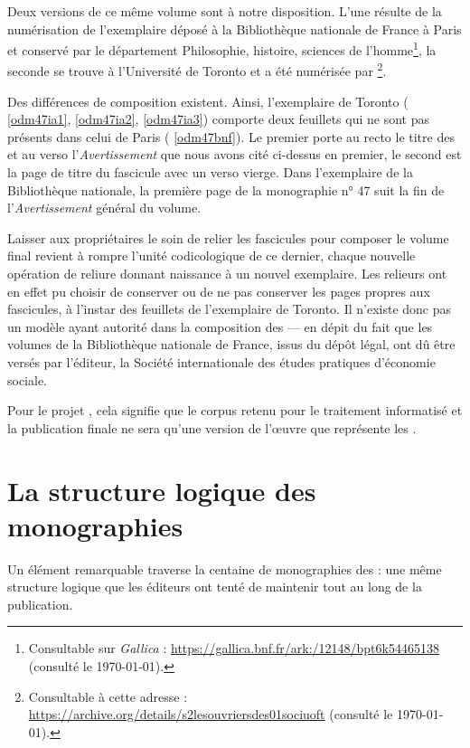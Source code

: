 Deux versions de ce même volume sont à notre disposition. L'une résulte de la numérisation de l'exemplaire déposé à la Bibliothèque nationale de France à Paris et conservé par le département Philosophie, histoire, sciences de l'homme\footnote{Consultable sur \textit{Gallica} : \url{https://gallica.bnf.fr/ark:/12148/bpt6k54465138} (consulté le \today).}, la seconde se trouve à l'Université de Toronto et a été numérisée par \ia\footnote{Consultable à cette adresse : \url{https://archive.org/details/s2lesouvriersdes01sociuoft} (consulté le \today).}.

Des différences de composition existent. Ainsi, l'exemplaire de Toronto (\fig{} \ref{odm47ia1}, \ref{odm47ia2}, \ref{odm47ia3}) comporte deux feuillets qui ne sont pas présents dans celui de Paris (\fig{} \ref{odm47bnf}). Le premier porte au recto le titre des \odm{} et au verso l'\textit{Avertissement} que nous avons cité ci-dessus en premier, le second est la page de titre du fascicule avec un verso vierge. Dans l'exemplaire de la Bibliothèque nationale, la première page de la monographie n° 47 suit la fin de l'\textit{Avertissement} général du volume.

Laisser aux propriétaires le soin de relier les fascicules pour composer le volume final revient à rompre l'unité codicologique de ce dernier, chaque nouvelle opération de reliure donnant naissance à un nouvel exemplaire. Les relieurs ont en effet pu choisir de conserver ou de ne pas conserver les pages propres aux fascicules, à l'instar des feuillets de l'exemplaire de Toronto. Il n'existe donc pas un modèle ayant autorité dans la composition des \odm{} --- en dépit du fait que les volumes de la Bibliothèque nationale de France, issus du dépôt légal, ont dû être versés par l'éditeur, \cad{} la Société internationale des études pratiques d'économie sociale.

Pour le projet \timeus{}, cela signifie que le corpus retenu pour le traitement informatisé et la publication finale ne sera qu'une version de l'\oe{}uvre que représente les \odm.

\section{La structure logique des monographies}

Un élément remarquable traverse la centaine de monographies des \odm{} : une même structure logique que les éditeurs ont tenté de maintenir tout au long de la publication.

